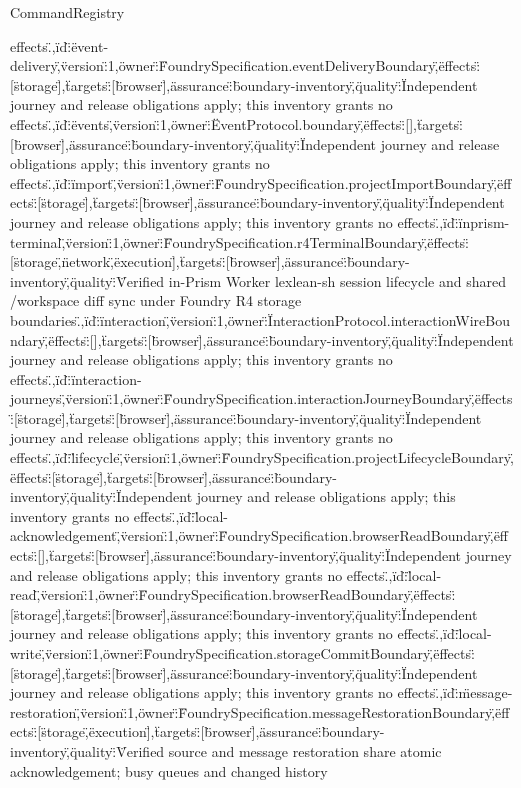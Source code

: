 \begin{lexlean}{CommandRegistry}
\begin{semanticmodule}
{effects.\"},{\"id\":\"event-delivery\",\"version\":1,\"owner\":\"FoundrySpecification.eventDeliveryBoundary\",\"effects\":[\"storage\"],\"targets\":[\"browser\"],\"assurance\":\"boundary-inventory\",\"quality\":\"Independent journey and release obligations apply; this inventory grants no effects.\"},{\"id\":\"events\",\"version\":1,\"owner\":\"EventProtocol.boundary\",\"effects\":[],\"targets\":[\"browser\"],\"assurance\":\"boundary-inventory\",\"quality\":\"Independent journey and release obligations apply; this inventory grants no effects.\"},{\"id\":\"import\",\"version\":1,\"owner\":\"FoundrySpecification.projectImportBoundary\",\"effects\":[\"storage\"],\"targets\":[\"browser\"],\"assurance\":\"boundary-inventory\",\"quality\":\"Independent journey and release obligations apply; this inventory grants no effects.\"},{\"id\":\"inprism-terminal\",\"version\":1,\"owner\":\"FoundrySpecification.r4TerminalBoundary\",\"effects\":[\"storage\",\"network\",\"execution\"],\"targets\":[\"browser\"],\"assurance\":\"boundary-inventory\",\"quality\":\"Verified in-Prism Worker lexlean-sh session lifecycle and shared /workspace diff sync under Foundry R4 storage boundaries.\"},{\"id\":\"interaction\",\"version\":1,\"owner\":\"InteractionProtocol.interactionWireBoundary\",\"effects\":[],\"targets\":[\"browser\"],\"assurance\":\"boundary-inventory\",\"quality\":\"Independent journey and release obligations apply; this inventory grants no effects.\"},{\"id\":\"interaction-journeys\",\"version\":1,\"owner\":\"FoundrySpecification.interactionJourneyBoundary\",\"effects\":[\"storage\"],\"targets\":[\"browser\"],\"assurance\":\"boundary-inventory\",\"quality\":\"Independent journey and release obligations apply; this inventory grants no effects.\"},{\"id\":\"lifecycle\",\"version\":1,\"owner\":\"FoundrySpecification.projectLifecycleBoundary\",\"effects\":[\"storage\"],\"targets\":[\"browser\"],\"assurance\":\"boundary-inventory\",\"quality\":\"Independent journey and release obligations apply; this inventory grants no effects.\"},{\"id\":\"local-acknowledgement\",\"version\":1,\"owner\":\"FoundrySpecification.browserReadBoundary\",\"effects\":[],\"targets\":[\"browser\"],\"assurance\":\"boundary-inventory\",\"quality\":\"Independent journey and release obligations apply; this inventory grants no effects.\"},{\"id\":\"local-read\",\"version\":1,\"owner\":\"FoundrySpecification.browserReadBoundary\",\"effects\":[\"storage\"],\"targets\":[\"browser\"],\"assurance\":\"boundary-inventory\",\"quality\":\"Independent journey and release obligations apply; this inventory grants no effects.\"},{\"id\":\"local-write\",\"version\":1,\"owner\":\"FoundrySpecification.storageCommitBoundary\",\"effects\":[\"storage\"],\"targets\":[\"browser\"],\"assurance\":\"boundary-inventory\",\"quality\":\"Independent journey and release obligations apply; this inventory grants no effects.\"},{\"id\":\"message-restoration\",\"version\":1,\"owner\":\"FoundrySpecification.messageRestorationBoundary\",\"effects\":[\"storage\",\"execution\"],\"targets\":[\"browser\"],\"assurance\":\"boundary-inventory\",\"quality\":\"Verified source and message restoration share atomic acknowledgement; busy queues and changed history }
\end{semanticmodule}
\end{lexlean}
